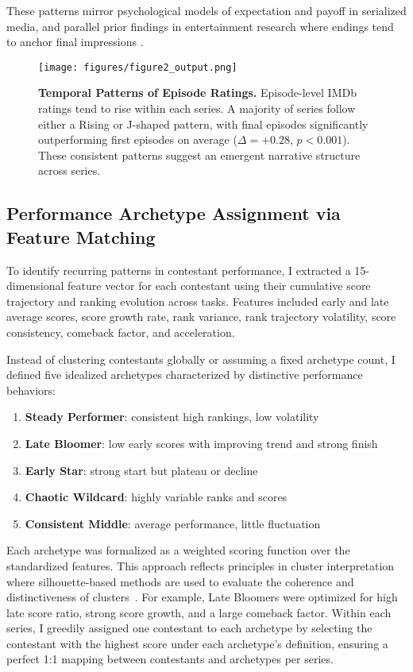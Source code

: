 \documentclass[10pt,letterpaper]{article}
\begin{document}
These patterns mirror psychological models of expectation and payoff in serialized media, and parallel prior findings in entertainment research where endings tend to anchor final impressions \cite{fredrickson1993peakend, vorderer2004, rozin2004temporal}.

\begin{figure}[!h]
\centering
\texttt{[image: figures/figure2\_output.png]}
\caption{{\bf Temporal Patterns of Episode Ratings.}
Episode-level IMDb ratings tend to rise within each series. A majority of series follow either a Rising or J-shaped pattern, with final episodes significantly outperforming first episodes on average ($\Delta = +0.28$, $p < 0.001$). These consistent patterns suggest an emergent narrative structure across series.}
\label{fig:episode_trajectories}
\end{figure}
\FloatBarrier

\subsection*{Performance Archetype Assignment via Feature Matching}

To identify recurring patterns in contestant performance, I extracted a 15-dimensional feature vector for each contestant using their cumulative score trajectory and ranking evolution across tasks. Features included early and late average scores, score growth rate, rank variance, rank trajectory volatility, score consistency, comeback factor, and acceleration.

Instead of clustering contestants globally or assuming a fixed archetype count, I defined five idealized archetypes characterized by distinctive performance behaviors:
\begin{enumerate}
  \item \textbf{Steady Performer}: consistent high rankings, low volatility
  \item \textbf{Late Bloomer}: low early scores with improving trend and strong finish
  \item \textbf{Early Star}: strong start but plateau or decline
  \item \textbf{Chaotic Wildcard}: highly variable ranks and scores
  \item \textbf{Consistent Middle}: average performance, little fluctuation
\end{enumerate}

Each archetype was formalized as a weighted scoring function over the standardized features. This approach reflects principles in cluster interpretation where silhouette-based methods are used to evaluate the coherence and distinctiveness of clusters~\cite{Rousseeuw1987}. For example, Late Bloomers were optimized for high late score ratio, strong score growth, and a large comeback factor. Within each series, I greedily assigned one contestant to each archetype by selecting the contestant with the highest score under each archetype’s definition, ensuring a perfect 1:1 mapping between contestants and archetypes per series.
\end{document}
